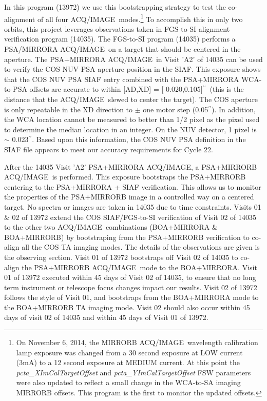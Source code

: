 \documentclass[12pt]{reportj}
\def\arcsec{\hbox{$^{\prime\prime}$}}
\newcommand*{\myfont}{\fontfamily{rm}\selectfont}
\def\acqimageno{{\myfont ACQ/IMAGE}\rm}
\def\acqimage{{\myfont ACQ/IMAGE}\rm~}
\begin{document}
In this program (13972) we use this bootstrapping strategy to test the co-alignment of all four \acqimage modes.\footnote{On November 6, 2014,
the MIRRORB \acqimage wavelength calibration lamp exposure was changed from a 30 second exposure
at LOW current (3mA) to a 12 second exposure at MEDIUM current. At this point the {\it pcta\_XImCalTargetOffset} and {\it pcta\_YImCalTargetOffset}
FSW parameters were also updated to reflect a small change in the WCA-to-SA imaging MIRRORB offsets. This program is the first
to monitor the updated offsets.}
To accomplish this in only two orbits, this project leverages observations taken in FGS-to-SI alignment verification
program (14035).
\clearpage
The FGS-to-SI program (14035) performs a PSA/MIRRORA \acqimage on a target that should be centered in the aperture.
The PSA+MIRRORA \acqimage in Visit 'A2' of 14035 can be used to verify the COS NUV PSA aperture position in the SIAF.
This exposure shows that the COS NUV PSA SIAF entry combined with the PSA+MIRRORA WCA-to-PSA offsets are
accurate to within [AD,XD] = [-0.020,0.105]\arcsec\ (this is the distance that the \acqimage slewed to center the target).
The COS aperture is only repeatable in the XD direction to $\pm$ one motor step (0.05\arcsec). In addition, the WCA location
cannot be measured to better than 1/2 pixel as the pixel used to determine the median location in an integer.
On the NUV detector, 1 pixel is $\sim$ 0.023\arcsec. Based upon this information, the COS NUV PSA definition
in the SIAF file appears to meet our accuracy requirements for Cycle 22.

After the 14035 Visit 'A2' PSA+MIRRORA \acqimageno, a PSA+MIRRORB \acqimage is performed.
This exposure bootstraps the PSA+MIRRORB centering to the PSA+MIRRORA + SIAF verification.
This allows us to monitor the properties of the PSA+MIRRORB image in a controlled way on a centered target. No spectra or images are taken in 14035 due to time constraints.
Visits 01 \& 02 of 13972 extend the COS SIAF/FGS-to-SI verification of Visit 02 of 14035 to the other two \acqimage combinations (BOA+MIRRORA \& BOA+MIRRORB) by bootstraping from the PSA+MIRRORB verification to co-align all the COS TA imaging modes. The details of the observations are given is the observing section.
Visit 01 of 13972 bootstraps off Visit 02 of 14035 to co-align the PSA+MIRRORB \acqimage mode to the BOA+MIRRORA. Visit 01 of 13972 executed within 45 days of Visit 02 of 14035, to ensure that no long term instrument or telescope focus changes impact our results.
Visit 02 of 13972 follows the style of Visit 01, and bootstraps from the BOA+MIRRORA mode to the BOA+MIRRORB TA imaging mode. Visit 02 should also occur within 45 days of visit 02 of 14035 and within 45 days of Visit 01 of 13972.
\end{document}
